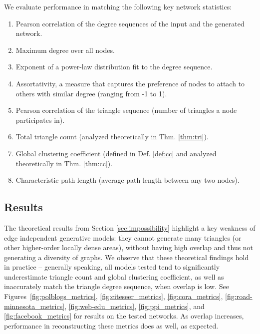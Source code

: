 We evaluate performance in matching the following key network statistics:
\begin{enumerate}
\item Pearson correlation of the degree sequences of the input and the generated network.
\item Maximum degree over all nodes.
\item Exponent of a power-law distribution fit to the degree sequence.
\item Assortativity, a measure that captures the preference of nodes to attach to others with similar degree (ranging from -1 to 1).
\item Pearson correlation of the triangle sequence (number of triangles a node participates in).
\item Total triangle count (analyzed theoretically in Thm. \ref{thm:tri}).
\item Global clustering coefficient (defined in Def. \ref{def:cc} and analyzed theoretically in Thm. \ref{thm:cc}).
\item Characteristic path length (average path length between any two nodes).
\end{enumerate} 

\subsection{Results}
The theoretical results from Section \ref{sec:impossibility} highlight a key weakness of edge independent generative
models: they cannot generate many triangles (or other higher-order locally dense areas), without having high overlap and thus not generating a diversity of graphs. We observe that these theoretical findings hold in practice -- generally speaking, all models tested tend to significantly underestimate triangle count and global clustering coefficient, as well as inaccurately match the triangle degree sequence, when overlap is low.
See Figures~\ref{fig:polblogs_metrics}, \ref{fig:citeseer_metrics}, \ref{fig:cora_metrics}, \ref{fig:road-minnesota_metrics}, \ref{fig:web-edu_metrics}, \ref{fig:ppi_metrics}, and \ref{fig:facebook_metrics} for results on the tested networks.
As overlap increases, performance in reconstructing these metrics does as well, as expected.

